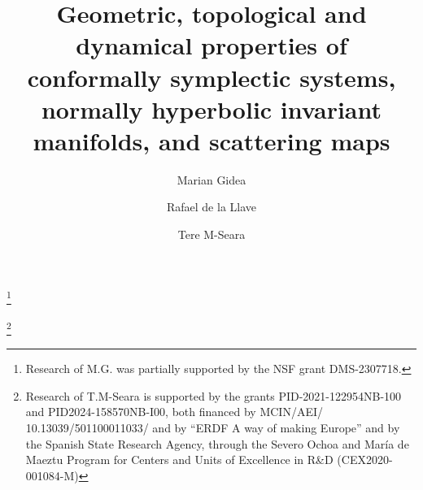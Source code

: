 \documentclass[11pt]{amsart}
\theoremstyle{definition}
\theoremstyle{remark}
\numberwithin{equation}{section}
\begin{document}
\title[ ]
      {Geometric, topological and dynamical properties of conformally symplectic systems,
       normally hyperbolic invariant manifolds, and   scattering maps}
\author[M. Gidea]{Marian  Gidea  }
\address{Yeshiva University, Department of Mathematical Sciences, New York, NY 10016, USA }
\thanks{Research of M.G. was partially supported by the NSF grant  DMS-2307718. }
\author[R. de la Llave]{Rafael de la Llave }
\address{School of Mathematics (Emeritus), Georgia Institute of Technology, Atlanta, GA 30332, USA}
\address{Yeshiva University, Department of Mathematical Sciences (affiliate), New York, NY 10016, USA }
\author[T. M-Seara]{Tere M-Seara }
\address{Departament de Matem\`{a}tiques, Universitat Polit\`{e}cnica de Catalunya, Diagonal 647, 08028 Barcelona, Spain, Centre de Recerca Matem\`{a}tica.}
\thanks{Research of T.M-Seara is supported by  the grants PID-2021-122954NB-100 and  PID2024-158570NB-I00, both
financed by  MCIN/AEI/ 10.13039/501100011033/ and by “ERDF A way of making Europe” and by
 the Spanish State Research Agency, through the Severo Ochoa and María de Maeztu Program for Centers and Units of Excellence in R\&D (CEX2020-
001084-M)}
\end{document}
